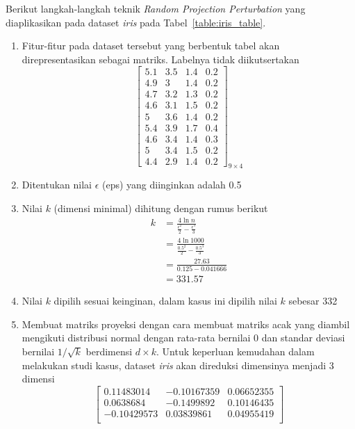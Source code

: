 \documentclass[a4paper,twoside]{article}
\begin{document}
\begin{enumerate}
		Berikut langkah-langkah teknik \textit{Random Projection Perturbation} yang diaplikasikan pada dataset \textit{iris} pada Tabel~\ref{table:iris_table}.
		\begin{enumerate}
			\item Fitur-fitur pada dataset tersebut yang berbentuk tabel akan direpresentasikan sebagai matriks. Labelnya tidak diikutsertakan
			\[
				\begin{bmatrix}
				5.1		&		3.5		&		1.4		&		0.2	\\
				4.9		&		3		&		1.4		&		0.2	\\
				4.7		&		3.2		&		1.3		&		0.2	\\
				4.6		&		3.1		&		1.5		&		0.2	\\
				5		&		3.6		&		1.4		&		0.2	\\
				5.4		&		3.9		&		1.7		&		0.4	\\
				4.6		&		3.4		&		1.4		&		0.3	\\
				5		&		3.4		&		1.5		&		0.2	\\
				4.4		&		2.9		&		1.4		&		0.2 
				\end{bmatrix}_{9\times 4}
			\]
			\item Ditentukan nilai \(\epsilon\) (eps) yang diinginkan adalah 0.5
			\item Nilai \(k\) (dimensi minimal) dihitung dengan rumus berikut
			\begin{align*}
				k &= \frac{4\ln{n}}{\frac{\epsilon^{2}}{2}-\frac{\epsilon^{3}}{3}} \\
				&= \frac{4\ln{1000}}{\frac{0.5^{2}}{2}-\frac{0.5^{3}}{3}} \\
				&= \frac{27.63}{0.125-0.041666} \\
				&= 331.57
			\end{align*}
			\item Nilai \(k\) dipilih sesuai keinginan, dalam kasus ini dipilih nilai \(k\) sebesar 332
			\item Membuat matriks proyeksi dengan cara membuat matriks acak yang diambil mengikuti distribusi normal dengan rata-rata bernilai 0 dan standar deviasi bernilai \(1/\sqrt{k}\) berdimensi \(d \times k\). Untuk keperluan kemudahan dalam melakukan studi kasus, dataset \textit{iris} akan direduksi dimensinya menjadi 3 dimensi
			\[
				\begin{bmatrix}
				0.11483014 &  -0.10167359  &  0.06652355 \\
				0.0638684 &   -0.1499892   &  0.10146435 \\
				-0.10429573 &   0.03839861 &   0.04955419 \\

\end{bmatrix}\]
\end{enumerate}
\end{enumerate}
\end{document}
